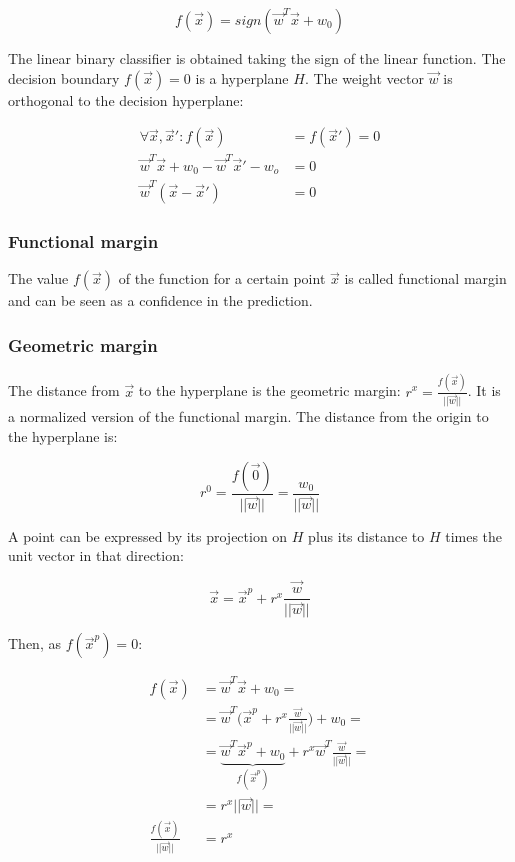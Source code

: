 	$$f(\vec{x}) = sign(\vec{w}^T\vec{x}+w_0)$$

	The linear binary classifier is obtained taking the sign of the linear function.
	The decision boundary $f(\vec{x}) = 0$ is a hyperplane $H$.
	The weight vector $\vec{w}$ is orthogonal to the decision hyperplane:

	\begin{align*}
		\forall\vec{x}, \vec{x}':f(\vec{x})&=f(\vec{x}') = 0\\
		\vec{w}^T\vec{x}+w_0-\vec{w}^T\vec{x}'-w_o &=0\\
		\vec{w}^T(\vec{x}-\vec{x}') &= 0
	\end{align*}

		\subsubsection{Functional margin}
		The value $f(\vec{x})$ of the function for a certain point $\vec{x}$ is called functional margin and can be seen as a confidence in the prediction.

		\subsubsection{Geometric margin}
		The distance from $\vec{x}$ to the hyperplane is the geometric margin: $r^x = \frac{f(\vec{x})}{||\vec{w}||}$.
		It is a normalized version of the functional margin.
		The distance from the origin to the hyperplane is:

		$$r^0 = \frac{f(\vec{0})}{||\vec{w}||} = \frac{w_0}{||\vec{w}||}$$

		A point can be expressed by its projection on $H$ plus its distance to $H$ times the unit vector in that direction:

		$$\vec{x} = \vec{x}^p + r^x\frac{\vec{w}}{||\vec{w}||}$$

		Then, as $f(\vec{x}^p) = 0$:

		\begin{align*}
			f(\vec{x}) &= \vec{w}^T\vec{x} + w_0=\\
								 &=\vec{w}^T\biggl(\vec{x}^p+r^x\frac{\vec{w}}{||\vec{w}||}\biggr)+w_0=\\
								 &=\underbrace{\vec{w}^T\vec{x}^p+w_0}_{f(\vec{x}^p)}+r^x\vec{w}^T\frac{\vec{w}}{||\vec{w}||}=\\
								 &=r^x||\vec{w}||=\\
			\frac{f(\vec{x})}{||\vec{w}||} & =r^x
		\end{align*}

